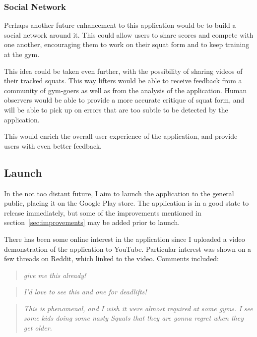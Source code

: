 \subsubsection{Social Network}

Perhaps another future enhancement to this application would be to build a social network around it. This could allow users to share scores and compete with one another, encouraging them to work on their squat form and to keep training at the gym.

This idea could be taken even further, with the possibility of sharing videos of their tracked squats. This way lifters would be able to receive feedback from a community of gym-goers as well as from the analysis of the application. Human observers would be able to provide a more accurate critique of squat form, and will be able to pick up on errors that are too subtle to be detected by the application.

This would enrich the overall user experience of the application, and provide users with even better feedback.

\subsection{Launch}

In the not too distant future, I aim to launch the application to the general public, placing it on the Google Play\cite{googleplay} store. The application is in a good state to release immediately, but some of the improvements mentioned in section~\ref{sec:improvements} may be added prior to launch.

There has been some online interest in the application since I uploaded a video demonstration of the application to YouTube\cite{youtube}. Particular interest was shown on a few threads on Reddit\cite{reddit}, which linked to the video. Comments included:

\begin{quote}
\emph{give me this already!}
\end{quote}

\begin{quote}
\emph{I'd love to see this and one for deadlifts!}
\end{quote}

\begin{quote}
\emph{This is phenomenal, and I wish it were almost required at some gyms. I see some kids doing some nasty Squats that they are gonna regret when they get older.}
\end{quote}


